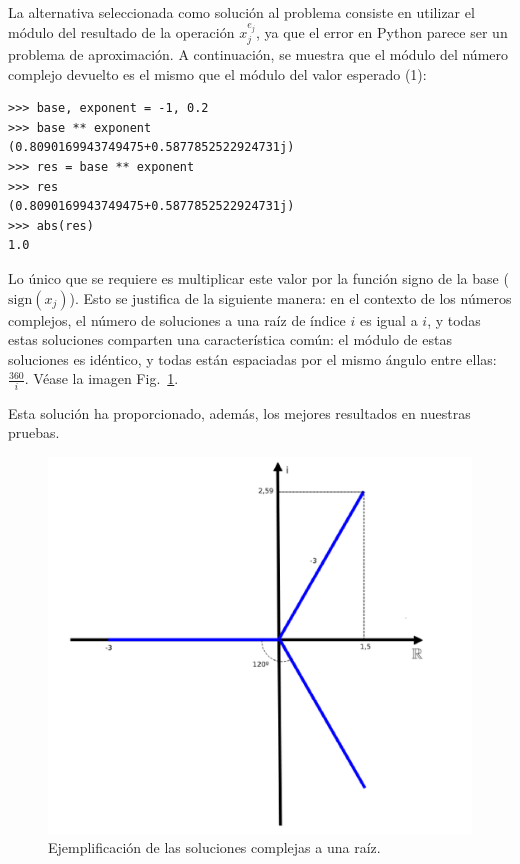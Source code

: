 \documentclass[conference,a4paper]{IEEEtran}
\def\figurename{Fig.}
\begin{document}
La alternativa seleccionada como solución al problema consiste en utilizar el módulo del resultado de la operación \(x_j^{e_j}\), ya que el error en Python parece ser un problema de aproximación. A continuación, se muestra que el módulo del número complejo devuelto es el mismo que el módulo del valor esperado (1):

\begin{verbatim}
>>> base, exponent = -1, 0.2
>>> base ** exponent
(0.8090169943749475+0.5877852522924731j)
>>> res = base ** exponent
>>> res
(0.8090169943749475+0.5877852522924731j)
>>> abs(res)
1.0
\end{verbatim}

Lo único que se requiere es multiplicar este valor por la función signo de la base (\(\text{sign}(x_j)\)). Esto se justifica de la siguiente manera: en el contexto de los números complejos, el número de soluciones a una raíz de índice \(i\) es igual a \(i\), y todas estas soluciones comparten una característica común: el módulo de estas soluciones es idéntico, y todas están espaciadas por el mismo ángulo entre ellas: \(\frac{360}{i}\). Véase la imagen \figurename~\ref{fig:roots_example}.

Esta solución ha proporcionado, además, los mejores resultados en nuestras pruebas.


\begin{figure}[h]
    \centering
    \includegraphics[width=\columnwidth]{image-roots-example.jpg}
    \caption{Ejemplificación de las soluciones complejas a una raíz.}
    \label{fig:roots_example}
\end{figure}
\end{document}
